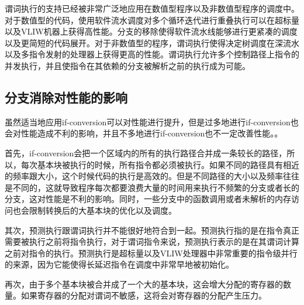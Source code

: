 谓词执行的支持已经被非常广泛地应用在数值型程序以及非数值型程序的调度中\cite{ScottA.Mahlke1992}。对于数值型的代码，使用软件流水调度对多个循环迭代进行重叠执行可以在超标量以及VLIW机器上获得高性能\cite{1989a}\cite{JosephP.Brutt}。分支的移除使得软件流水线能够进行更紧凑的调度以及更简短的代码展开。对于非数值型的程序，谓词执行使得决定树调度在深流水以及多指令发射的处理器上获得更高的性能\cite{Hsu1986}。谓词执行允许多个控制路径上指令的并发执行，并且使指令在其依赖的分支被解析之前的执行成为可能。

\subsection{分支消除对性能的影响}\label{ifcvt_harm_performance}

虽然适当地应用if-conversion可以对性能进行提升，但是过多地进行if-conversion也会对性能造成不利的影响，并且不多地进行if-conversion也不一定改善性能。\cite{ScottA.Mahlke1992}\cite{Tian2010}。

首先，if-conversion会把一个区域内的所有的执行路径合并成一条较长的路径，所以，每次基本块被执行的时候，所有指令都必须被执行。如果不同的路径具有相近的频率跟大小，这个时候代码的执行是高效的。但是不同路径的大小以及频率往往是不同的，这就导致程序每次都要浪费大量的时间用来执行不频繁的分支或者长的分支，这对性能是不利的影响。同时，一些分支中的函数调用或者未解析的内存访问也会限制转换后的大基本块的优化以及调度。

其次，预测执行跟谓词执行并不能很好地符合到一起。预测执行指的是在指令真正需要被执行之前将指令执行，对于谓词指令来说，预测执行表示的是在其谓词计算之前对指令的执行。预测执行是超标量以及VLIW处理器中非常重要的指令级并行的来源，因为它能使得长延迟指令在调度中非常早地被初始化。

再次，由于多个基本块被合并成了一个大的基本块，这会增大分配的寄存器的数量。如果寄存器的分配对谓词不敏感，这将会对寄存器的分配产生压力\cite{Quinones2006}\cite{Quinones2007}。